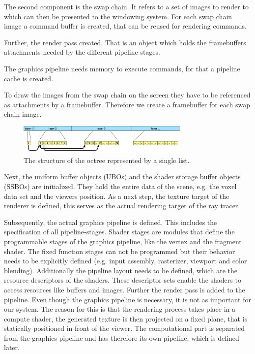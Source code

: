 \documentclass[12pt,conference]{IEEEtran}
\begin{document}
The second component is the swap chain. It refers to a set of images to render to which can then be presented to the windowing system. For each swap chain image a command buffer is created, that can be reused for rendering commands.

Further, the render pass created. That is an object which holds the framebuffers attachments needed by the different pipeline stages.

The graphics pipeline needs memory to execute commands, for that a pipeline cache is created.

To draw the images from the swap chain on the screen they have to be referenced as attachments by a framebuffer. Therefore we create a framebuffer for each swap chain image.
\begin{figure}[htp]
	\centering
	\includegraphics[width=0.75\textwidth]{images/datastructure.png}
	\caption{The structure of the octree represented by a single list.}
	\label{fig:datastructure}
\end{figure}
Next, the uniform buffer objects (UBOs) and the shader storage buffer objects (SSBOs) are initialized. They hold the entire data of the scene, e.g. the voxel data set and the viewers position. As a next step, the texture target of the renderer is defined, this serves as the actual rendering target of the ray tracer.
\par
Subsequently, the actual graphics pipeline is defined. This includes the specification of all pipeline-stages. Shader stages are modules that define the programmable stages of the graphics pipeline, like the vertex and the fragment shader. The fixed function stages can not be programmed but their behavior needs to be explicitly defined (e.g. input assembly, rasterizer, viewport and color blending). Additionally the pipeline layout needs to be defined, which are the resource descriptors of the shaders. These descriptor sets enable the shaders to access resources like buffers and images. Further the render pass is added to the pipeline. 
Even though the graphics pipeline is necessary, it is not as important for our system. The reason for this is that the rendering process takes place in a compute shader, the generated texture is then projected on a fixed plane, that is statically positioned in front of the viewer. The computational part is separated from the graphics pipeline and has therefore its own pipeline, which is defined later.
\end{document}
